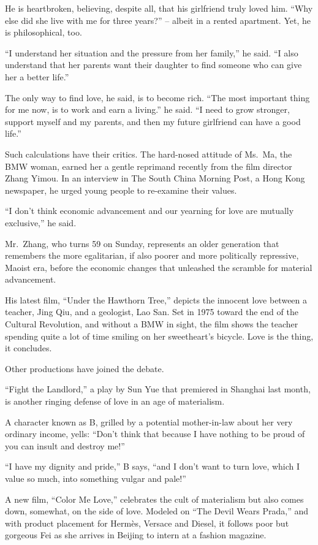 ﻿\documentclass[12pt]{article}
\begin{document}
He is heartbroken, believing, despite all, that his girlfriend truly loved him. ``Why else did she
live with me for three years?'' -- albeit in a rented apartment. Yet, he is philosophical, too.

``I understand her situation and the pressure from her family,'' he said. ``I also understand that
her parents want their daughter to find someone who can give her a better life.''

The only way to find love, he said, is to become rich. ``The most important thing for me now, is to
work and earn a living.'' he said. ``I need to grow stronger, support myself and my parents, and
then my future girlfriend can have a good life.''

Such calculations have their critics. The hard-nosed attitude of Ms.~Ma, the BMW woman, earned her a
gentle reprimand recently from the film director Zhang Yimou. In an interview in The South China
Morning Post, a Hong Kong newspaper, he urged young people to re-examine their values.

``I don't think economic advancement and our yearning for love are mutually exclusive,'' he said.

Mr.~Zhang, who turns 59 on Sunday, represents an older generation that remembers the more
egalitarian, if also poorer and more politically repressive, Maoist era, before the economic changes
that unleashed the scramble for material advancement.

His latest film, ``Under the Hawthorn Tree,'' depicts the innocent love between a teacher, Jing Qiu,
and a geologist, Lao San. Set in 1975 toward the end of the Cultural Revolution, and without a BMW
in sight, the film shows the teacher spending quite a lot of time smiling on her sweetheart's
bicycle. Love is the thing, it concludes.

Other productions have joined the debate.

``Fight the Landlord,'' a play by Sun Yue that premiered in Shanghai last month, is another ringing
defense of love in an age of materialism.

A character known as B, grilled by a potential mother-in-law about her very ordinary income, yells:
``Don't think that because I have nothing to be proud of you can insult and destroy me!''

``I have my dignity and pride,'' B says, ``and I don't want to turn love, which I value so much,
into something vulgar and pale!''

A new film, ``Color Me Love,'' celebrates the cult of materialism but also comes down, somewhat, on
the side of love. Modeled on ``The Devil Wears Prada,'' and with product placement for Herm\`es,
Versace and Diesel, it follows poor but gorgeous Fei as she arrives in Beijing to intern at a
fashion magazine.
\end{document}

